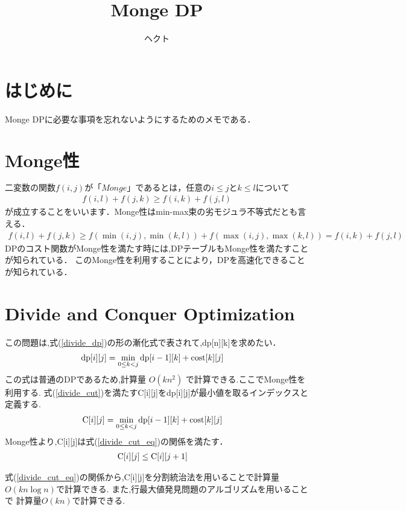 \documentclass[fleqn]{jarticle}
\begin{document}
\title{Monge DP}
\author{ヘクト}
\maketitle

\section{はじめに}
Monge DPに必要な事項を忘れないようにするためのメモである．

\section{Monge性}
$
二変数の関数f(i,j)が「Monge」であるとは，任意の i \le j と k \le l について
$
\begin{align}
f(i,l) + f(j,k) \ge f(i,k) + f(j,l)
\end{align}
が成立することをいいます．Monge性はmin-max束の劣モジュラ不等式だとも言える．
\begin{align}
f(i,l) + f(j,k) \ge f(\min(i,j),\min(k,l)) + f(\max(i,j),\max(k,l)) = f(i,k) + f(j,l)
\end{align}
DPのコスト関数がMonge性を満たす時には,DPテーブルもMonge性を満たすことが知られている．
このMonge性を利用することにより，DPを高速化できることが知られている．

\section{Divide and Conquer Optimization}
この問題は,式(\ref{divide_dp})の形の漸化式で表されて,dp[n][k]を求めたい．
\begin{align}
&{\rm dp}[i][j] = \min_{0\le k<j}{{\rm dp}[i-1][k]+{\rm cost}[k][j]} \label{divide_dp} 
\end{align}
この式は普通のDPであるため,計算量 $O(kn^2)$ で計算できる.ここでMonge性を利用する.
式(\ref{divide_cut})を満たすC[i][j]をdp[i][j]が最小値を取るインデックスと定義する. 
\begin{align}
&{\rm C}[i][j] =\min_{0\le k<j}{{\rm dp}[i-1][k]+{\rm cost}[k][j]} \label{divide_cut}
\end{align}
Monge性より,C[i][j]は式(\ref{divide_cut_eq})の関係を満たす．
\begin{align}
&{\rm C}[i][j] \le {\rm C}[i][j+1]  \label{divide_cut_eq}
\end{align}

式(\ref{divide_cut_eq})の関係から,C[i][j]を分割統治法を用いることで計算量$O(kn\log{n})$で計算できる.  また,行最大値発見問題のアルゴリズムを用いることで
計算量$O(kn)$で計算できる.
\end{document}
